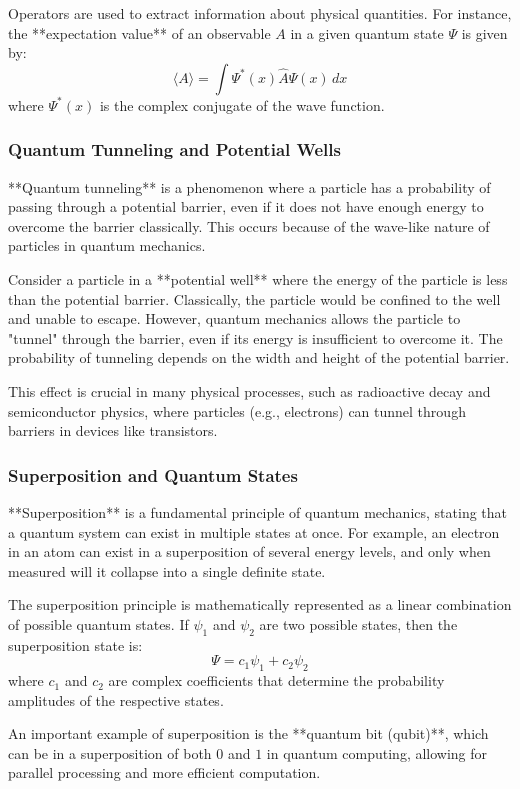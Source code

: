 \documentclass{article}
\begin{document}
Operators are used to extract information about physical quantities. For instance, the **expectation value** of an observable \( A \) in a given quantum state \( \Psi \) is given by:
\[
\langle A \rangle = \int \Psi^*(x) \hat{A} \Psi(x) \, dx
\]
where \( \Psi^*(x) \) is the complex conjugate of the wave function.

\subsubsection*{Quantum Tunneling and Potential Wells}

**Quantum tunneling** is a phenomenon where a particle has a probability of passing through a potential barrier, even if it does not have enough energy to overcome the barrier classically. This occurs because of the wave-like nature of particles in quantum mechanics.

Consider a particle in a **potential well** where the energy of the particle is less than the potential barrier. Classically, the particle would be confined to the well and unable to escape. However, quantum mechanics allows the particle to "tunnel" through the barrier, even if its energy is insufficient to overcome it. The probability of tunneling depends on the width and height of the potential barrier.

This effect is crucial in many physical processes, such as radioactive decay and semiconductor physics, where particles (e.g., electrons) can tunnel through barriers in devices like transistors.

\subsubsection*{Superposition and Quantum States}

**Superposition** is a fundamental principle of quantum mechanics, stating that a quantum system can exist in multiple states at once. For example, an electron in an atom can exist in a superposition of several energy levels, and only when measured will it collapse into a single definite state.

The superposition principle is mathematically represented as a linear combination of possible quantum states. If \( \psi_1 \) and \( \psi_2 \) are two possible states, then the superposition state is:
\[
\Psi = c_1 \psi_1 + c_2 \psi_2
\]
where \( c_1 \) and \( c_2 \) are complex coefficients that determine the probability amplitudes of the respective states.

An important example of superposition is the **quantum bit (qubit)**, which can be in a superposition of both \( 0 \) and \( 1 \) in quantum computing, allowing for parallel processing and more efficient computation.
\end{document}
